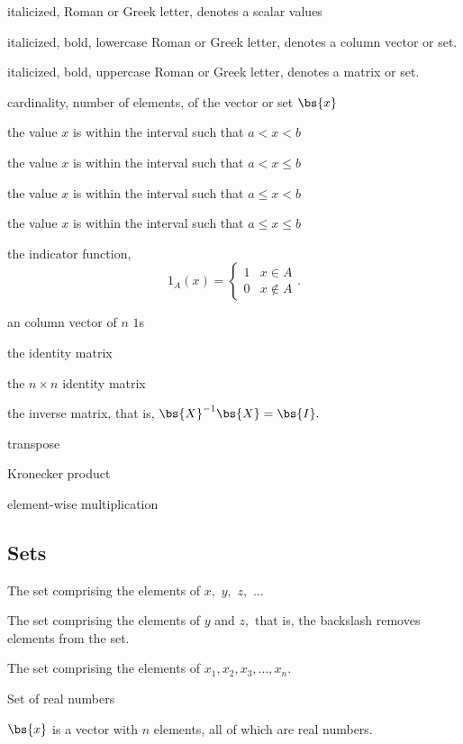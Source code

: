 \documentclass[english,10pt]{ucdenver-dissertation}
\begin{document}
\begin{description}[leftmargin=!, labelwidth=0.7in]
  \item[$x$]             italicized, Roman or Greek letter, denotes a scalar values 
  \item[$\bs{x}$]        italicized, bold, lowercase Roman or Greek letter, denotes a column vector or set.
  \item[$\bs{X}$]        italicized, bold, uppercase Roman or Greek letter, denotes a matrix or set.
  \item[$\card{\bs{x}}$] cardinality, number of elements, of the vector or set $\bs{x}$ 
  \item[$x \in (a, b)$]  the value $x$ is within the interval such that $a < x < b$
  \item[{$x \in (a, b]$}]  the value $x$ is within the interval such that $a < x \leq b$
  \item[$x \in [a, b)$]  the value $x$ is within the interval such that $a \leq x < b$
  \item[{$x \in [a, b]$}]  the value $x$ is within the interval such that $a \leq x \leq b$ 
  \item[$1_{A}\left(x\right)$] the indicator function,\[1_{A}\left(x \right) = \begin{cases} 1 & x \in A \\ 0 & x \notin A \end{cases}.\] 
  \item[$\bs{1}_n$] an column vector of $n$ $1$s
  \item[$\bs{I}$] the identity matrix
  \item[$\bs{I}_n$] the $n \times n$ identity matrix
  \item[$\bs{X}^{-1}$] the inverse matrix, that is, $\bs{X}^{-1} \bs{X} = \bs{I}.$
  \item[$\bs{X}^{T}$] transpose
  \item[$\otimes$] Kronecker product
  \item[$\odot$] element-wise multiplication
\end{description}

\subsection{Sets}

\begin{description}[leftmargin=!, labelwidth=0.8in]
  \item[$\{x, y, z, \ldots\}$]  The set comprising the elements of $x,$ $y,$ $z,$ $\ldots$ 
  \item[$\{x, y, z\} \backslash x$]  The set comprising the elements of $y$ and $z,$ that is, the backslash removes elements from the set.
  \item[$\left\{x_i\right\}_{i = 1}^{n}$]  The set comprising the elements of $x_1, x_2, x_3, \ldots, x_n.$ 
  \item[$\mathbb{R}$] Set of real numbers 
  \item[$\bs{x} \in \mathbb{R}^n$] $\bs{x}$ is a vector with $n$ elements, all of which are real numbers.
\end{description}
\end{document}
